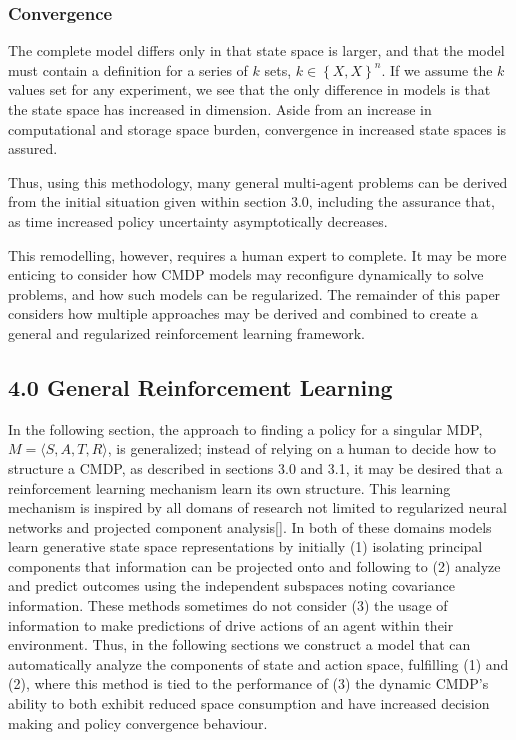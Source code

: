 \documentclass[compsoc,journal,letterpaper,10pt,draftclsnofoot,onecolumn]{IEEEtran}
\begin{document}
\subsubsection{Convergence}\label{convergence-2}

The complete model differs only in that state space is larger, and that
the model must contain a definition for a series of \(k\) sets,
\(k \in \left\{ X,X \right\}^{n}\). If we assume the \(k\) values set
for any experiment, we see that the only difference in models is that
the state space has increased in dimension. Aside from an increase in
computational and storage space burden, convergence in increased state
spaces is assured.

Thus, using this methodology, many general multi-agent problems can be
derived from the initial situation given within section 3.0, including
the assurance that, as time increased policy uncertainty asymptotically
decreases.

This remodelling, however, requires a human expert to complete. It may
be more enticing to consider how CMDP models may reconfigure dynamically
to solve problems, and how such models can be regularized. The remainder
of this paper considers how multiple approaches may be derived and
combined to create a general and regularized reinforcement learning
framework.

\subsection{4.0 General Reinforcement
Learning}\label{general-reinforcement-learning}

In the following section, the approach to finding a policy for a
singular MDP, \(M = \langle S, A, T, R \rangle \), is generalized; instead of relying on
a human to decide how to structure a CMDP, as described in sections 3.0
and 3.1, it may be desired that a reinforcement learning mechanism learn
its own structure. This learning mechanism is inspired by all domans of
research not limited to regularized neural networks and projected
component analysis{[}{]}. In both of these domains models learn
generative state space representations by initially (1) isolating
principal components that information can be projected onto and
following to (2) analyze and predict outcomes using the independent
subspaces noting covariance information. These methods sometimes do not
consider (3) the usage of information to make predictions of drive
actions of an agent within their environment. Thus, in the following
sections we construct a model that can automatically analyze the
components of state and action space, fulfilling (1) and (2), where this
method is tied to the performance of (3) the dynamic CMDP's ability to
both exhibit reduced space consumption and have increased decision
making and policy convergence behaviour.
\end{document}
